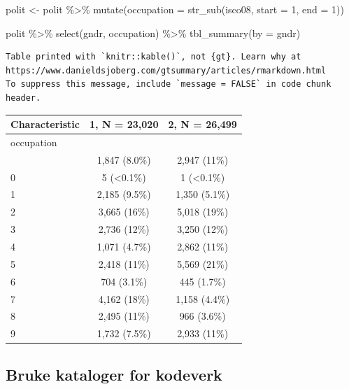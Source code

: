 \documentclass[
  letterpaper,
  DIV=11,
  numbers=noendperiod]{scrreprt}
\newenvironment{Shaded}{\begin{snugshade}}{\end{snugshade}}
\newcommand{\AttributeTok}[1]{\textcolor[rgb]{0.40,0.45,0.13}{#1}}
\newcommand{\DecValTok}[1]{\textcolor[rgb]{0.68,0.00,0.00}{#1}}
\newcommand{\FunctionTok}[1]{\textcolor[rgb]{0.28,0.35,0.67}{#1}}
\newcommand{\NormalTok}[1]{\textcolor[rgb]{0.00,0.23,0.31}{#1}}
\newcommand{\OtherTok}[1]{\textcolor[rgb]{0.00,0.23,0.31}{#1}}
\newcommand{\SpecialCharTok}[1]{\textcolor[rgb]{0.37,0.37,0.37}{#1}}
\theoremstyle{definition}
\theoremstyle{remark}
\begin{document}
\begin{Shaded}
\begin{Highlighting}[]
\NormalTok{polit }\OtherTok{\textless{}{-}}\NormalTok{ polit }\SpecialCharTok{\%\textgreater{}\%} 
  \FunctionTok{mutate}\NormalTok{(}\AttributeTok{occupation =} \FunctionTok{str\_sub}\NormalTok{(isco08, }\AttributeTok{start =} \DecValTok{1}\NormalTok{, }\AttributeTok{end =} \DecValTok{1}\NormalTok{)) }

\NormalTok{polit }\SpecialCharTok{\%\textgreater{}\%} 
  \FunctionTok{select}\NormalTok{(gndr, occupation) }\SpecialCharTok{\%\textgreater{}\%} 
  \FunctionTok{tbl\_summary}\NormalTok{(}\AttributeTok{by =}\NormalTok{ gndr)}
\end{Highlighting}
\end{Shaded}

\begin{verbatim}
Table printed with `knitr::kable()`, not {gt}. Learn why at
https://www.danieldsjoberg.com/gtsummary/articles/rmarkdown.html
To suppress this message, include `message = FALSE` in code chunk header.
\end{verbatim}

\begin{longtable}[]{@{}lcc@{}}
\toprule()
\textbf{Characteristic} & \textbf{1}, N = 23,020 & \textbf{2}, N =
26,499 \\
\midrule()
\endhead
occupation & & \\
& 1,847 (8.0\%) & 2,947 (11\%) \\
0 & 5 (\textless0.1\%) & 1 (\textless0.1\%) \\
1 & 2,185 (9.5\%) & 1,350 (5.1\%) \\
2 & 3,665 (16\%) & 5,018 (19\%) \\
3 & 2,736 (12\%) & 3,250 (12\%) \\
4 & 1,071 (4.7\%) & 2,862 (11\%) \\
5 & 2,418 (11\%) & 5,569 (21\%) \\
6 & 704 (3.1\%) & 445 (1.7\%) \\
7 & 4,162 (18\%) & 1,158 (4.4\%) \\
8 & 2,495 (11\%) & 966 (3.6\%) \\
9 & 1,732 (7.5\%) & 2,933 (11\%) \\
\bottomrule()
\end{longtable}

\hypertarget{bruke-kataloger-for-kodeverk}{%
\subsection{Bruke kataloger for
kodeverk}\label{bruke-kataloger-for-kodeverk}}
\end{document}
